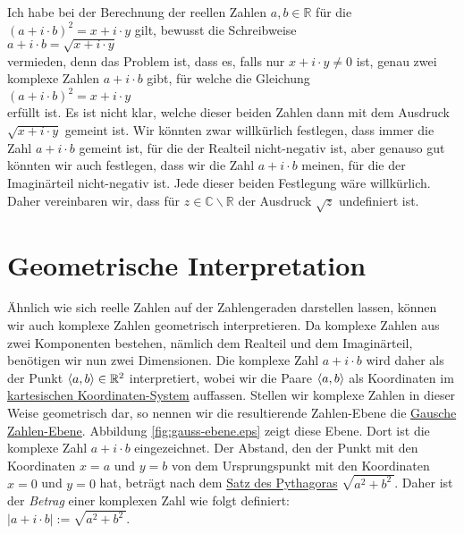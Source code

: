 \remark
Ich habe bei der Berechnung der reellen Zahlen $a, b \in \mathbb{R}$ f\"ur die $(a + i \cdot b)^2 = x + i \cdot y$ gilt,
bewusst die Schreibweise 
\\[0.2cm]
\hspace*{1.3cm}
$a + i \cdot b = \sqrt{x + i \cdot y}$
\\[0.2cm]
{\color{red}vermieden}, denn das Problem ist, dass es, falls nur $x + i \cdot y \not= 0$ ist, genau
zwei komplexe Zahlen $a + i \cdot b$  gibt, f\"ur welche die Gleichung 
\\[0.2cm]
\hspace*{1.3cm}
 $(a + i \cdot b)^2 = x + i \cdot y$ 
\\[0.2cm]
erf\"ullt ist.   Es ist nicht klar, welche dieser beiden Zahlen dann mit dem Ausdruck
$\sqrt{x + i \cdot y}$ gemeint ist.  Wir k\"onnten zwar willk\"urlich festlegen, dass immer die
Zahl $a + i \cdot b$ gemeint ist, f\"ur die der Realteil nicht-negativ ist, aber genauso gut k\"onnten
wir auch festlegen, dass wir die Zahl  $a + i \cdot b$ meinen, f\"ur die der Imagin\"{a}rteil
nicht-negativ ist.  Jede dieser beiden Festlegung w\"are willk\"urlich.  Daher vereinbaren wir, dass
f\"ur $z \in \mathbb{C}\backslash\mathbb{R}$ der Ausdruck $\sqrt{z}$ undefiniert ist. 


\section{Geometrische Interpretation}
\"{A}hnlich wie sich reelle Zahlen auf der Zahlengeraden darstellen lassen, k\"{o}nnen wir auch komplexe Zahlen
geometrisch interpretieren.  Da komplexe Zahlen aus zwei Komponenten bestehen, n\"{a}mlich dem Realteil und dem Imagin\"{a}rteil, 
ben\"{o}tigen wir nun zwei Dimensionen.  Die komplexe Zahl $a + i \cdot b$ wird daher als der Punkt 
$\pair(a, b) \in \mathbb{R}^2$ interpretiert, wobei wir die Paare $\pair(a, b)$ als Koordinaten im
\href{https://de.wikipedia.org/wiki/Kartesisches_Koordinatensystem}{kartesischen Koordinaten-System} auffassen.
Stellen wir komplexe Zahlen in dieser Weise geometrisch dar, so nennen wir die resultierende Zahlen-Ebene
die \href{https://de.wikipedia.org/wiki/Gaußsche_Zahlenebene}{Gau\3sche Zahlen-Ebene}.  Abbildung
\ref{fig:gauss-ebene.eps} zeigt diese Ebene.  
Dort ist die komplexe Zahl $a + i \cdot b$ eingezeichnet.  Der Abstand, den der Punkt mit den Koordinaten
$x = a$ und $y = b$ von dem Ursprungspunkt mit den Koordinaten $x = 0$ und $y = 0$ hat, betr\"{a}gt nach dem
\href{https://de.wikipedia.org/wiki/Satz_des_Pythagoras}{Satz des Pythagoras} $\sqrt{a^2 + b^2\,}$.  
Daher ist der \emph{\color{blue}Betrag} einer komplexen Zahl wie folgt definiert:
\\[0.2cm]
\hspace*{1.3cm}
$|a + i \cdot b| := \sqrt{a^2 + b^2\,}$.



